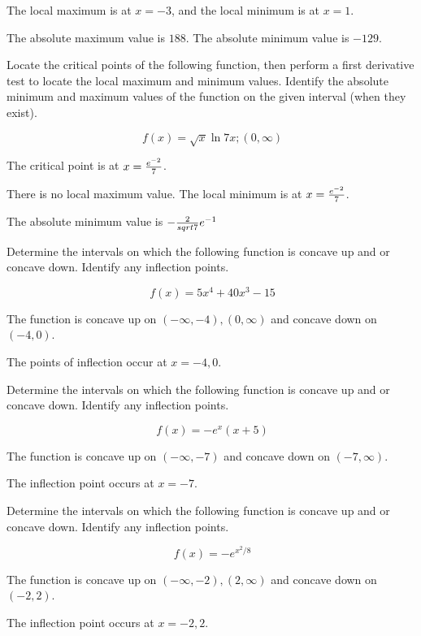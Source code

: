 \par The local maximum is at $x=-3$, and the local minimum
is at $x = 1$.

\par The absolute maximum value is $188$. The absolute minimum value is
$-129$.

Locate the critical points of the following function, then
perform a first derivative test to locate the local maximum and
minimum values. Identify the absolute minimum and maximum values
of the function on the given interval (when they exist).

$$\
f(x) = \sqrt{x} \ln {7x}; (0, \infty)
$$

The critical point is at $x = {e^{-2} \over 7}$.

\par There is no local maximum value. The local minimum is
at $x = {e^{-2} \over 7}$.

\par The absolute minimum value is $- {2 \over sqrt{7}} e^{-1}$

Determine the intervals on which the following function is
concave up and or concave down. Identify any inflection points.

$$\
f(x) = 5x^4 + 40x^3 - 15
$$

The function is concave up on $(-\infty, -4), (0, \infty)$
and concave down on $(-4, 0)$.

\par The points of inflection occur at $x = -4, 0$.

Determine the intervals on which the following function is
concave up and or concave down. Identify any inflection points.

$$\
f(x) = -e^{x}(x+5)
$$

The function is concave up on $(-\infty, -7)$
and concave down on $(-7, \infty)$.

\par The inflection point occurs at $x = -7$.

Determine the intervals on which the following function is
concave up and or concave down. Identify any inflection points.

$$\
f(x) = -e^{x^2/8}
$$

The function is concave up on $(-\infty, -2), (2,\infty)$
and concave down on $(-2, 2)$.

\par The inflection point occurs at $x = -2, 2$.

